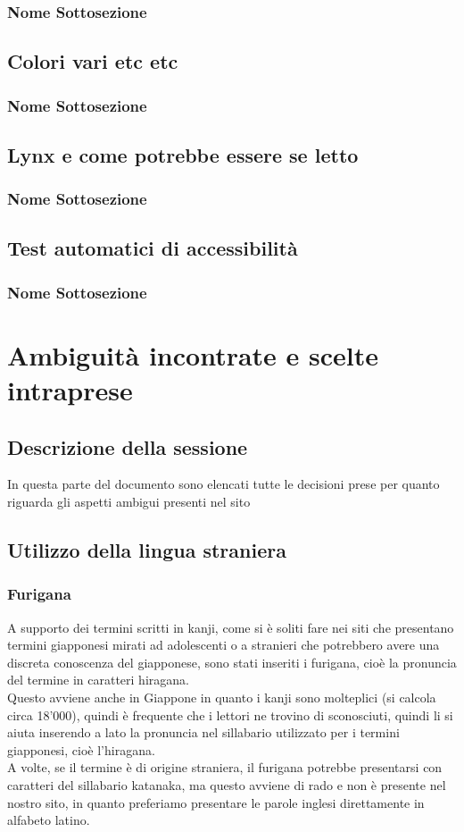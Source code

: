 \documentclass[openany, a4paper, 12pt]{report}
\begin{document}
			\subsection{Nome Sottosezione}
		\section{Colori vari etc etc}
			\subsection{Nome Sottosezione}
		\section{Lynx e come potrebbe essere se letto}
			\subsection{Nome Sottosezione}
		\section{Test automatici di accessibilità}
			\subsection{Nome Sottosezione}
	
	\chapter{Ambiguità incontrate e scelte intraprese}
		\section{Descrizione della sessione}
			In questa parte del documento sono elencati tutte le decisioni prese per quanto riguarda gli aspetti ambigui presenti nel sito\\
		\section{Utilizzo della lingua straniera}
			\subsection{Furigana}
				A supporto dei termini scritti in kanji, come si è soliti fare nei siti che presentano termini giapponesi mirati ad adolescenti o a stranieri che potrebbero avere una discreta conoscenza del giapponese, sono stati inseriti i furigana, cioè la pronuncia del termine in caratteri hiragana.\\
				Questo avviene anche in Giappone in quanto i kanji sono molteplici (si calcola circa 18'000), quindi è frequente che i lettori ne trovino di sconosciuti, quindi li si aiuta inserendo a lato la pronuncia nel sillabario utilizzato per i termini giapponesi, cioè l'hiragana.\\
				A volte, se il termine è di origine straniera, il furigana potrebbe presentarsi con caratteri del sillabario katanaka, ma questo avviene di rado e non è presente nel nostro sito, in quanto preferiamo presentare le parole inglesi direttamente in alfabeto latino. 
\end{document}
